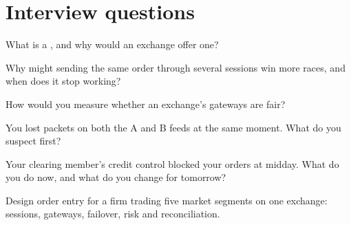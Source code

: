 \section{Interview questions}

\begin{interviewq}\label{iq:nw:futures-connectivity:1}
What is a , and why would an exchange offer one?
\end{interviewq}

\begin{interviewq}\label{iq:nw:futures-connectivity:2}
Why might sending the same order through several sessions win more races, and when does it stop working?
\end{interviewq}

\begin{interviewq}\label{iq:nw:futures-connectivity:3}
How would you measure whether an exchange's gateways are fair?
\end{interviewq}

\begin{interviewq}\label{iq:nw:futures-connectivity:4}
You lost packets on both the A and B feeds at the same moment. What do you suspect first?
\end{interviewq}

\begin{interviewq}\label{iq:nw:futures-connectivity:5}
Your clearing member's credit control blocked your orders at midday. What do you do now, and what do you change for tomorrow?
\end{interviewq}

\begin{interviewq}\label{iq:nw:futures-connectivity:6}
Design order entry for a firm trading five market segments on one exchange: sessions, gateways, failover, risk and reconciliation.
\end{interviewq}

